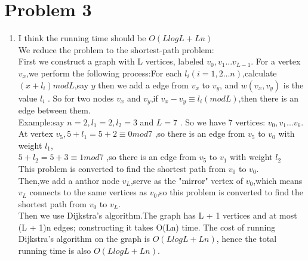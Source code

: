 \documentclass[paper=a4, fontsize=11pt]{scrartcl} %
\numberwithin{equation}{section} %
\numberwithin{figure}{section} %
\numberwithin{table}{section} %
\begin{document}
\section*{Problem 3}
\begin{enumerate}[label={3.\arabic*}]
  \item 
I think the running time should be ${O(L log L + Ln)}$\\
We reduce the problem to the shortest-path problem:\\
First we construct a graph with  L vertices, labeled ${v_0,v_1...v_{L-1}}$.
For a vertex ${v_x}$,we perform the following process:For  each ${l_i (i=1,2...n)}$,calculate ${(x+l_i) mod L }$,say ${y}$
then we add a edge from ${v_x }$ to ${v_y}$, and ${ w(v_x, v_y) }$ is the value ${ l_i }$ .
So for two nodes ${v_x}$ and ${v_y}$,if ${v_x-v_y \equiv l_i (mod L) }$,then there is an edge  between them. \\
Example:say  ${ n=2,l_1=2,l_2=3  }$ and ${ L=7}$ . So  we  have  7  vertices: ${  v_0,v_1...v_6}$. \\
At vertex  ${  v_5,5+l_1=5+2 \equiv 0  mod 7 }$ ,so there is an edge from ${v_5}$ to ${ v_0}$ with weight ${ l_1 }$,\\
${ 5+l_2=5+3 \equiv 1 mod 7 }$ ,so there is an edge from ${v_5}$  to ${ v_1}$ with weight  ${ l_2 }$\\
This problem is converted to find the shortest path from ${v_0 }$  to  ${v_0 }$.\\
Then,we add a anthor node ${v_L}$,serve as the "mirror" vertex  of ${v_0}$,which means ${v_L}$ connects to the same vertices
as ${v_0}$,so this problem is converted to find the shortest path from ${v_0 }$  to  ${v_L}$.\\
Then we use Dijkstra's algorithm.The graph has L + 1 vertices and at most (L + 1)n edges; constructing it takes O(Ln) time. The cost of running Dijkstra's algorithm on the graph is ${O(L log L + Ln)}$, hence the total running time is also ${O(L log L + Ln)}$.

\end{enumerate}

\end{document}
